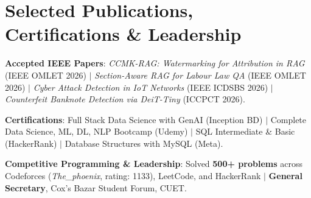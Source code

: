 \documentclass[a4paper,9.5pt]{article}
\begin{document}
\section{Selected Publications, Certifications \& Leadership}
\begin{itemize}[leftmargin=10pt, topsep=1pt, itemsep=1.5pt]
  \footnotesize{
    \item \textbf{Accepted IEEE Papers}: \textit{CCMK-RAG: Watermarking for Attribution in RAG} (IEEE OMLET 2026) $|$ \textit{Section-Aware RAG for Labour Law QA} (IEEE OMLET 2026) $|$ \textit{Cyber Attack Detection in IoT Networks} (IEEE ICDSBS 2026) $|$ \textit{Counterfeit Banknote Detection via DeiT-Tiny} (ICCPCT 2026).
    \item \textbf{Certifications}: Full Stack Data Science with GenAI (Inception BD) $|$ Complete Data Science, ML, DL, NLP Bootcamp (Udemy) $|$ SQL Intermediate \& Basic (HackerRank) $|$ Database Structures with MySQL (Meta).
    \item \textbf{Competitive Programming \& Leadership}: Solved \textbf{500+ problems} across Codeforces (\textit{The\_phoenix}, rating: 1133), LeetCode, and HackerRank $|$ \textbf{General Secretary}, Cox's Bazar Student Forum, CUET.
  }
\end{itemize}
\end{document}
